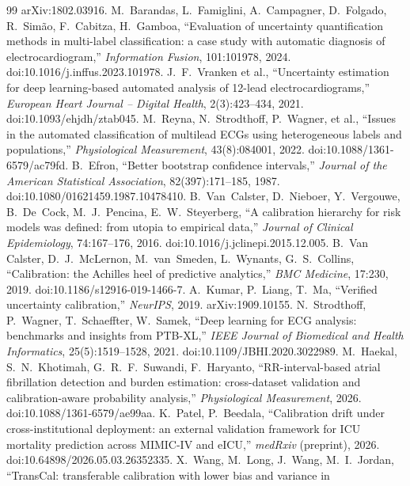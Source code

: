 \documentclass[final,5p,times,nonatbib]{elsarticle}
\begin{document}
\begin{thebibliography}{99}
arXiv:1802.03916.
 M.~Barandas, L.~Famiglini, A.~Campagner,
D.~Folgado, R.~Sim\~ao, F.~Cabitza, H.~Gamboa, ``Evaluation of
uncertainty quantification methods in multi-label classification: a
case study with automatic diagnosis of electrocardiogram,''
\emph{Information Fusion}, 101:101978, 2024.
doi:10.1016/j.inffus.2023.101978.
 J.~F.~Vranken et al., ``Uncertainty estimation for
deep learning-based automated analysis of 12-lead
electrocardiograms,'' \emph{European Heart Journal -- Digital Health},
2(3):423--434, 2021. doi:10.1093/ehjdh/ztab045.
 M.~Reyna, N.~Strodthoff, P.~Wagner, et al.,
``Issues in the automated classification of multilead ECGs using
heterogeneous labels and populations,'' \emph{Physiological
Measurement}, 43(8):084001, 2022. doi:10.1088/1361-6579/ac79fd.
 B.~Efron, ``Better bootstrap confidence
intervals,'' \emph{Journal of the American Statistical Association},
82(397):171--185, 1987. doi:10.1080/01621459.1987.10478410.
 B.~Van~Calster, D.~Nieboer, Y.~Vergouwe,
B.~De~Cock, M.~J.~Pencina, E.~W.~Steyerberg, ``A calibration hierarchy for
risk models was defined: from utopia to empirical data,''
\emph{Journal of Clinical Epidemiology}, 74:167--176, 2016.
doi:10.1016/j.jclinepi.2015.12.005.
 B.~Van Calster, D.~J.~McLernon,
M.~van~Smeden, L.~Wynants, G.~S.~Collins, ``Calibration: the Achilles
heel of predictive analytics,'' \emph{BMC Medicine}, 17:230, 2019.
doi:10.1186/s12916-019-1466-7.
 A.~Kumar, P.~Liang, T.~Ma, ``Verified uncertainty
calibration,'' \emph{NeurIPS}, 2019. arXiv:1909.10155.
 N.~Strodthoff, P.~Wagner, T.~Schaeffter,
W.~Samek, ``Deep learning for ECG analysis: benchmarks and insights
from PTB-XL,'' \emph{IEEE Journal of Biomedical and Health
Informatics}, 25(5):1519--1528, 2021.
doi:10.1109/JBHI.2020.3022989.
 M.~Haekal, S.~N.~Khotimah,
G.~R.~F.~Suwandi, F.~Haryanto, ``RR-interval-based atrial fibrillation
detection and burden estimation: cross-dataset validation and
calibration-aware probability analysis,'' \emph{Physiological
Measurement}, 2026. doi:10.1088/1361-6579/ae99aa.
 K.~Patel, P.~Beedala, ``Calibration drift under
cross-institutional deployment: an external validation framework for
ICU mortality prediction across MIMIC-IV and eICU,'' \emph{medRxiv}
(preprint), 2026. doi:10.64898/2026.05.03.26352335.
 X.~Wang, M.~Long, J.~Wang, M.~I.~Jordan,
``TransCal: transferable calibration with lower bias and variance in

\end{thebibliography}
\end{document}
